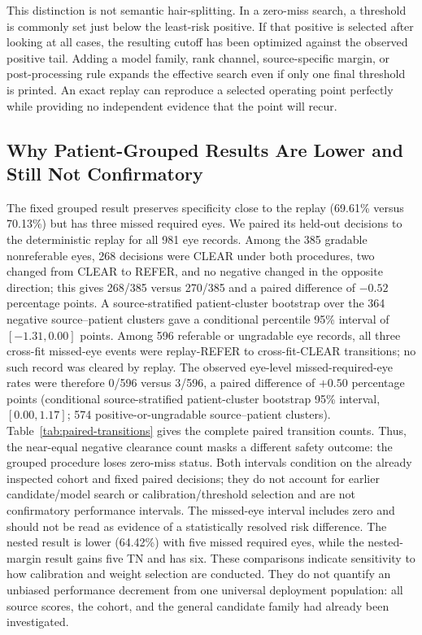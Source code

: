 \documentclass{ieeeaccess}
\begin{document}
This distinction is not semantic hair-splitting. In a zero-miss search, a threshold is commonly set just below the least-risk positive. If that positive is selected after looking at all cases, the resulting cutoff has been optimized against the observed positive tail. Adding a model family, rank channel, source-specific margin, or post-processing rule expands the effective search even if only one final threshold is printed. An exact replay can reproduce a selected operating point perfectly while providing no independent evidence that the point will recur.

\subsection{Why Patient-Grouped Results Are Lower and Still Not Confirmatory}
The fixed grouped result preserves specificity close to the replay (69.61\% versus 70.13\%) but has three missed required eyes. We paired its held-out decisions to the deterministic replay for all 981 eye records. Among the 385 gradable nonreferable eyes, 268 decisions were CLEAR under both procedures, two changed from CLEAR to REFER, and no negative changed in the opposite direction; this gives 268/385 versus 270/385 and a paired difference of $-0.52$ percentage points. A source-stratified patient-cluster bootstrap over the 364 negative source--patient clusters gave a conditional percentile 95\% interval of $[-1.31,0.00]$ points. Among 596 referable or ungradable eye records, all three cross-fit missed-eye events were replay-REFER to cross-fit-CLEAR transitions; no such record was cleared by replay. The observed eye-level missed-required-eye rates were therefore 0/596 versus 3/596, a paired difference of $+0.50$ percentage points (conditional source-stratified patient-cluster bootstrap 95\% interval, $[0.00,1.17]$; 574 positive-or-ungradable source--patient clusters). Table~\ref{tab:paired-transitions} gives the complete paired transition counts. Thus, the near-equal negative clearance count masks a different safety outcome: the grouped procedure loses zero-miss status. Both intervals condition on the already inspected cohort and fixed paired decisions; they do not account for earlier candidate/model search or calibration/threshold selection and are not confirmatory performance intervals. The missed-eye interval includes zero and should not be read as evidence of a statistically resolved risk difference. The nested result is lower (64.42\%) with five missed required eyes, while the nested-margin result gains five TN and has six. These comparisons indicate sensitivity to how calibration and weight selection are conducted. They do not quantify an unbiased performance decrement from one universal deployment population: all source scores, the cohort, and the general candidate family had already been investigated.
\end{document}
